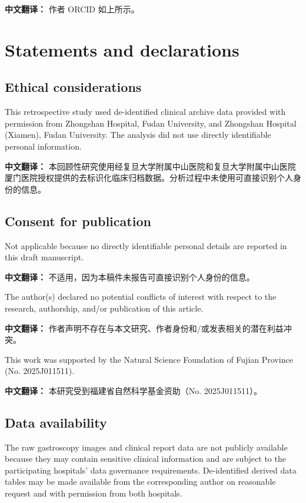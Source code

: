 \documentclass[Afour,sagev,times]{sagej}
\begin{document}
\textbf{中文翻译：} 作者 ORCID 如上所示。

\section*{Statements and declarations}
\subsection*{Ethical considerations}

This retrospective study used de-identified clinical archive data provided with permission from Zhongshan Hospital, Fudan University, and Zhongshan Hospital (Xiamen), Fudan University. The analysis did not use directly identifiable personal information.

\textbf{中文翻译：} 本回顾性研究使用经复旦大学附属中山医院和复旦大学附属中山医院厦门医院授权提供的去标识化临床归档数据。分析过程中未使用可直接识别个人身份的信息。

\subsection*{Consent for publication}

Not applicable because no directly identifiable personal details are reported in this draft manuscript.

\textbf{中文翻译：} 不适用，因为本稿件未报告可直接识别个人身份的信息。

\begin{dci}
The author(s) declared no potential conflicts of interest with respect to the research, authorship, and/or publication of this article.
\end{dci}

\textbf{中文翻译：} 作者声明不存在与本文研究、作者身份和/或发表相关的潜在利益冲突。

\begin{funding}
This work was supported by the Natural Science Foundation of Fujian Province (No. 2025J011511).
\end{funding}

\textbf{中文翻译：} 本研究受到福建省自然科学基金资助（No. 2025J011511）。

\subsection*{Data availability}

The raw gastroscopy images and clinical report data are not publicly available because they may contain sensitive clinical information and are subject to the participating hospitals' data governance requirements. De-identified derived data tables may be made available from the corresponding author on reasonable request and with permission from both hospitals.
\end{document}
